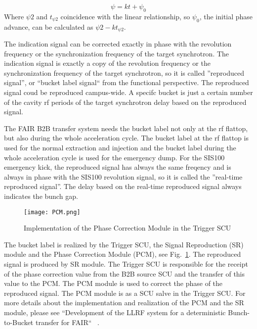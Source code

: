 \begin{equation}
\psi= kt+\psi_0 \label{linear}
\end{equation}
Where $\psi2$ and $t_{\psi2}$ coincidence with the linear relationship, so $\psi_0$, the initial phase advance, can be calculated as $\psi2-kt_{\psi2}$.


The indication signal can be corrected exactly in phase with the revolution frequency or the synchronization frequency of the target synchrotron.  The indication signal is exactly a copy of the revolution frequency or the synchronization frequency of the target synchrotron, so it is called ''reproduced signal'', or ``bucket label signal`` from the functional perspective.  The reproduced signal coud be reproduced campus-wide. A specifc bucket is just a certain number of the cavity rf periods of the target synchrotron delay based on the reproduced signal.


The FAIR B2B transfer system needs the bucket label not only at the rf flattop, but also during the whole acceleration cycle. The bucket label at the rf flattop is used for the normal extraction and injection and the bucket label during the whole acceleration cycle is used for the emergency dump. For the SIS100 emergency kick, the reproduced signal has always the same freqency and is always in phase with the SIS100 revolution signal, so it is called the ''real-time reproduced signal''. The delay based on the real-time reproduced signal always indicates the bunch gap.


 \begin{figure}[!htb]
   \centering   
   \texttt{[image: PCM.png]}
   \caption{Implementation of the Phase Correction Module in the Trigger SCU}
   \label{PCM}
\end{figure}
The bucket label is realized by the Trigger SCU, the Signal Reproduction (SR) module and the Phase Correction Module (PCM), see Fig.~\ref{PCM}. The reproduced signal is produced by SR module. The Trigger SCU is responsible for the receipt of the phase correction value from the B2B source SCU and the transfer of this value to the PCM. The PCM module is used to correct the phase of the reproduced signal. The PCM module is as a SCU salve in the Trigger SCU. For more details about the implementation and realization of the PCM and the SR module, please see ``Development of the LLRF system for a deterministic Bunch-to-Bucket transfer for FAIR`` ~\cite{ferrand_development_????}. 

